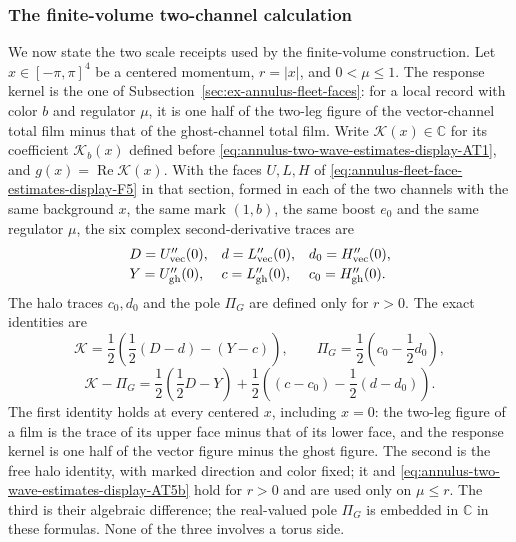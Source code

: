 \subsubsection{The finite-volume two-channel calculation}

We now state the two scale receipts used by the finite-volume construction.
Let $x\in[-\pi,\pi]^4$ be a centered momentum, $r=|x|$, and
$0<\mu\leq1$. The response kernel is the one of
Subsection~\ref{sec:ex-annulus-fleet-faces}: for a local record with color
$b$ and regulator $\mu$, it is one half of the two-leg figure of the
vector-channel total film minus that of the ghost-channel total film.
Write $\mathcal K(x)\in\mathbb C$ for its coefficient $\mathcal K_b(x)$
defined before \eqref{eq:annulus-two-wave-estimates-display-AT1}, and $g(x)=\operatorname{Re}\mathcal K(x)$. With
the faces $U,L,H$ of \eqref{eq:annulus-fleet-face-estimates-display-F5} in that section, formed in each of the two
channels with the same background $x$, the same mark $(1,b)$, the same
boost $e_0$ and the same regulator $\mu$, the six complex
second-derivative traces are
\[
\begin{array}{lll}
 D=U_{\rm vec}''(0),& d=L_{\rm vec}''(0),& d_0=H_{\rm vec}''(0),\\[2pt]
 Y=U_{\rm gh}''(0),& c=L_{\rm gh}''(0),& c_0=H_{\rm gh}''(0).
\end{array}
\]
The halo traces $c_0,d_0$ and the pole $\Pi_G$ are defined only for
$r>0$. The exact identities are
\begin{equation}\label{eq:ex-two-wave-identities}
 \mathcal K=\frac12\left(\frac12(D-d)-(Y-c)\right),\qquad
 \Pi_G=\frac12\left(c_0-\frac12d_0\right),
\end{equation}
\begin{equation}
 \mathcal K-\Pi_G=\frac12\left(\frac12D-Y\right)
       +\frac12\left((c-c_0)-\frac12(d-d_0)\right).
 \label{eq:annulus-two-wave-estimates-display-AT5b}
\end{equation}
The first identity holds at every centered $x$, including $x=0$: the
two-leg figure of a film is the trace of its upper face minus that of
its lower face, and the response kernel is one half of the vector
figure minus the ghost figure. The second is the free halo
identity, with marked direction and color fixed; it and \eqref{eq:annulus-two-wave-estimates-display-AT5b} hold for
$r>0$ and are used only on $\mu\leq r$. The third is their
algebraic difference; the real-valued pole $\Pi_G$ is embedded in $\mathbb C$
in these formulas. None of the three involves a torus side.

